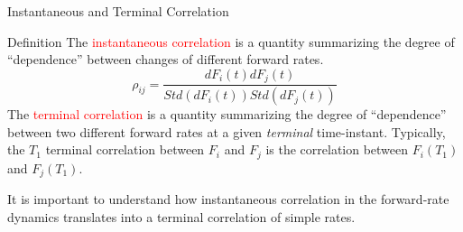 \documentclass{beamer}
\begin{document}
\begin{frame}{Instantaneous and Terminal Correlation}
	\begin{block}{Definition}
		The \textcolor{red}{instantaneous correlation} is a quantity summarizing the degree of “dependence” between changes of different forward rates.
		\begin{equation*}
			\rho_{ij} = \frac{dF_i(t) dF_j(t)}{Std(dF_i(t)) Std(dF_j(t))}
		\end{equation*}
		The \textcolor{red}{terminal correlation} is a quantity summarizing the degree of “dependence” between two different forward rates at a given \emph{terminal} time-instant. Typically, the $T_1$ terminal correlation between $F_i$ and $F_j$ is the correlation between $F_i(T_1)$ and $F_j(T_1)$.
	\end{block}
	It is important to understand how instantaneous correlation in the forward-rate dynamics translates into a terminal correlation of simple rates.
\end{frame}
\end{document}
